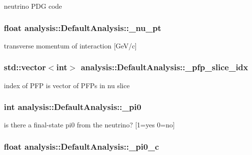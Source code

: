 neutrino P\-D\-G code \hypertarget{classanalysis_1_1DefaultAnalysis_a901956985dfd610c781bedf7bfc9754a}{
\subsubsection[{\-\_\-nu\-\_\-pt}]{\setlength{\rightskip}{0pt plus 5cm}float analysis\-::\-Default\-Analysis\-::\-\_\-nu\-\_\-pt\hspace{0.3cm}{\ttfamily [private]}}}\label{classanalysis_1_1DefaultAnalysis_a901956985dfd610c781bedf7bfc9754a}
transverse momentum of interaction \mbox{[}Ge\-V/c\mbox{]} \hypertarget{classanalysis_1_1DefaultAnalysis_acbf0c279993cbefca72f38bc5e9f6627}{
\subsubsection[{\-\_\-pfp\-\_\-slice\-\_\-idx}]{\setlength{\rightskip}{0pt plus 5cm}std\-::vector$<$int$>$ analysis\-::\-Default\-Analysis\-::\-\_\-pfp\-\_\-slice\-\_\-idx\hspace{0.3cm}{\ttfamily [private]}}}\label{classanalysis_1_1DefaultAnalysis_acbf0c279993cbefca72f38bc5e9f6627}
index of P\-F\-P is vector of P\-F\-Ps in nu slice \hypertarget{classanalysis_1_1DefaultAnalysis_a2a00585c8fd4fcc84f42d50f271ff78a}{
\subsubsection[{\-\_\-pi0}]{\setlength{\rightskip}{0pt plus 5cm}int analysis\-::\-Default\-Analysis\-::\-\_\-pi0\hspace{0.3cm}{\ttfamily [private]}}}\label{classanalysis_1_1DefaultAnalysis_a2a00585c8fd4fcc84f42d50f271ff78a}
is there a final-\/state pi0 from the neutrino? \mbox{[}1=yes 0=no\mbox{]} \hypertarget{classanalysis_1_1DefaultAnalysis_a255069926e7e8a83629b9dac19bf7473}{
\subsubsection[{\-\_\-pi0\-\_\-c}]{\setlength{\rightskip}{0pt plus 5cm}float analysis\-::\-Default\-Analysis\-::\-\_\-pi0\-\_\-c\hspace{0.3cm}{\ttfamily [private]}}}\label{classanalysis_1_1DefaultAnalysis_a255069926e7e8a83629b9dac19bf7473}

